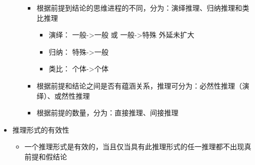 \documentclass[11pt]{article}
\begin{document}
\begin{itemize}
\begin{itemize}
\begin{itemize}
\item 根据前提到结论的思维进程的不同，分为：演绎推理、归纳推理和类比推理
\begin{itemize}
\item 演绎： 一般->一般 或 一般->特殊 外延未扩大
\item 归纳： 特殊->一般
\item 类比： 个体->个体
\end{itemize}
\item 根据前提和结论之间是否有蕴涵关系，推理可分为：必然性推理（演绎）、或然性推理
\item 根据前提的数量，分为：直接推理、间接推理
\end{itemize}
\end{itemize}
\item 推理形式的有效性
\begin{itemize}
\item 一个推理形式是有效的，当且仅当具有此推理形式的任一推理都不出现真前提和假结论
\end{itemize}
\end{itemize}
\end{document}
